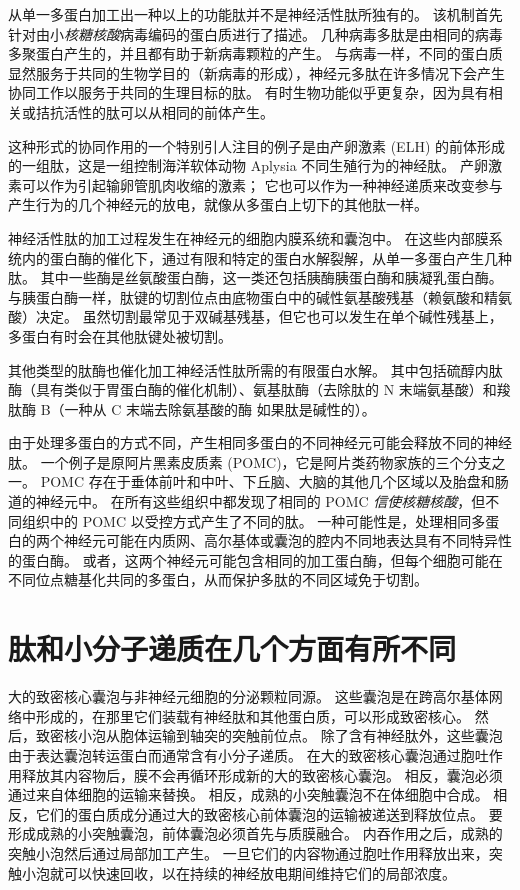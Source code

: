 从单一多蛋白加工出一种以上的功能肽并不是神经活性肽所独有的。
该机制首先针对由小\textit{核糖核酸}病毒编码的蛋白质进行了描述。
几种病毒多肽是由相同的病毒多聚蛋白产生的，并且都有助于新病毒颗粒的产生。
与病毒一样，不同的蛋白质显然服务于共同的生物学目的（新病毒的形成），神经元多肽在许多情况下会产生协同工作以服务于共同的生理目标的肽。
有时生物功能似乎更复杂，因为具有相关或拮抗活性的肽可以从相同的前体产生。


这种形式的协同作用的一个特别引人注目的例子是由产卵激素 (ELH) 的前体形成的一组肽，这是一组控制海洋软体动物 Aplysia 不同生殖行为的神经肽。
产卵激素可以作为引起输卵管肌肉收缩的激素；
它也可以作为一种神经递质来改变参与产生行为的几个神经元的放电，就像从多蛋白上切下的其他肽一样。


神经活性肽的加工过程发生在神经元的细胞内膜系统和囊泡中。
在这些内部膜系统内的蛋白酶的催化下，通过有限和特定的蛋白水解裂解，从单一多蛋白产生几种肽。
其中一些酶是丝氨酸蛋白酶，这一类还包括胰酶胰蛋白酶和胰凝乳蛋白酶。
与胰蛋白酶一样，肽键的切割位点由底物蛋白中的碱性氨基酸残基（赖氨酸和精氨酸）决定。
虽然切割最常见于双碱基残基，但它也可以发生在单个碱性残基上，多蛋白有时会在其他肽键处被切割。


其他类型的肽酶也催化加工神经活性肽所需的有限蛋白水解。
其中包括硫醇内肽酶（具有类似于胃蛋白酶的催化机制）、氨基肽酶（去除肽的 N 末端氨基酸）和羧肽酶 B（一种从 C 末端去除氨基酸的酶 如果肽是碱性的）。


由于处理多蛋白的方式不同，产生相同多蛋白的不同神经元可能会释放不同的神经肽。
一个例子是原阿片黑素皮质素 (POMC)，它是阿片类药物家族的三个分支之一。
POMC 存在于垂体前叶和中叶、下丘脑、大脑的其他几个区域以及胎盘和肠道的神经元中。
在所有这些组织中都发现了相同的 POMC \textit{信使核糖核酸}，但不同组织中的 POMC 以受控方式产生了不同的肽。
一种可能性是，处理相同多蛋白的两个神经元可能在内质网、高尔基体或囊泡的腔内不同地表达具有不同特异性的蛋白酶。
或者，这两个神经元可能包含相同的加工蛋白酶，但每个细胞可能在不同位点糖基化共同的多蛋白，从而保护多肽的不同区域免于切割。



\section{肽和小分子递质在几个方面有所不同}

大的致密核心囊泡与非神经元细胞的分泌颗粒同源。
这些囊泡是在跨高尔基体网络中形成的，在那里它们装载有神经肽和其他蛋白质，可以形成致密核心。
然后，致密核小泡从胞体运输到轴突的突触前位点。
除了含有神经肽外，这些囊泡由于表达囊泡转运蛋白而通常含有小分子递质。
在大的致密核心囊泡通过胞吐作用释放其内容物后，膜不会再循环形成新的大的致密核心囊泡。
相反，囊泡必须通过来自体细胞的运输来替换。
相反，成熟的小突触囊泡不在体细胞中合成。
相反，它们的蛋白质成分通过大的致密核心前体囊泡的运输被递送到释放位点。
要形成成熟的小突触囊泡，前体囊泡必须首先与质膜融合。
内吞作用之后，成熟的突触小泡然后通过局部加工产生。 
一旦它们的内容物通过胞吐作用释放出来，突触小泡就可以快速回收，以在持续的神经放电期间维持它们的局部浓度。


